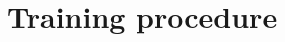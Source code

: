 \documentclass[pdflatex,sn-mathphys-num]{sn-jnl}
\theoremstyle{thmstyleone}\newtheorem{theorem}{Theorem}
\theoremstyle{thmstyletwo}\newtheorem{example}{Example}\newtheorem{remark}{Remark}
\theoremstyle{thmstylethree}\newtheorem{definition}{Definition}
\begin{document}




\section{Training procedure}






\end{document}
